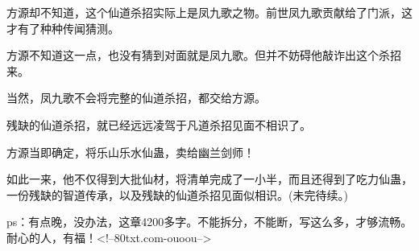 \begin{this_body}
方源却不知道，这个仙道杀招实际上是凤九歌之物。前世凤九歌贡献给了门派，这才有了种种传闻猜测。

方源不知道这一点，也没有猜到对面就是凤九歌。但并不妨碍他敲诈出这个杀招来。

当然，凤九歌不会将完整的仙道杀招，都交给方源。

残缺的仙道杀招，就已经远远凌驾于凡道杀招见面不相识了。

方源当即确定，将乐山乐水仙蛊，卖给幽兰剑师！

如此一来，他不仅得到大批仙材，将清单完成了一小半，而且还得到了吃力仙蛊，一份残缺的智道传承，以及残缺的仙道杀招见面似相识。(未完待续。)

ps：有点晚，没办法，这章4200多字。不能拆分，不能断，写这么多，才够流畅。耐心的人，有福！<!--80txt.com-ouoou-->

\end{this_body}

